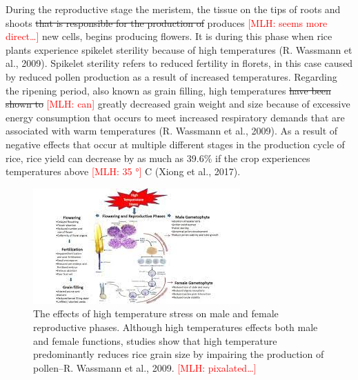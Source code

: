 \documentclass{book}\usepackage{knitr}
\newcommand{\red}[1]{\textcolor{red}{[MLH: #1]}}
\begin{document}
{ During the reproductive stage the meristem, the tissue on the tips of roots and shoots \st{that is responsible for the production of} produces \red{seems more direct\ldots} new cells, begins producing flowers. It is during this phase when rice plants experience spikelet sterility because of high temperatures (R. Wassmann et al., 2009). Spikelet sterility refers to reduced fertility in florets, in this case caused by reduced pollen production as a result of increased temperatures. Regarding the ripening period, also known as grain filling, high temperatures \st{have been shown to} \red{can} greatly decreased grain weight and size because of excessive energy consumption that occurs to meet increased respiratory demands that are associated with warm temperatures (R. Wassmann et al., 2009). As a result of negative effects that occur at multiple different stages in the production cycle of rice, rice yield can decrease by as much as 39.6\% if the crop experiences temperatures above \red{35 °} C (Xiong et al., 2017).
 
\begin{figure}
\includegraphics[width=\linewidth]{images/myanmar/Image5.jpg}
\caption{The effects of high temperature stress on male and female reproductive phases. Although high temperatures effects both male and female functions, studies show that high temperature predominantly reduces rice grain size by impairing the production of pollen--R. Wassmann et al., 2009. \red{pixalated\ldots}}
\end{figure}

}
\end{document}
